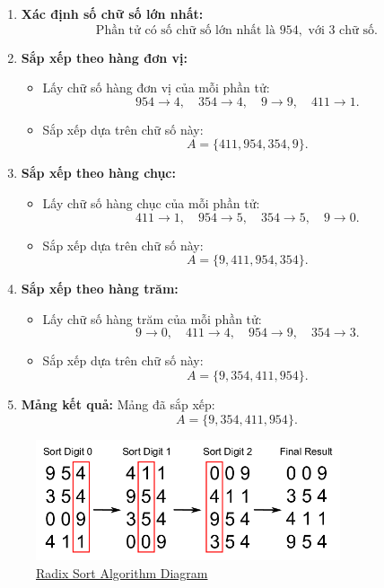 \begin{enumerate}
    \item \textbf{Xác định số chữ số lớn nhất:}
    \[
    \text{Phần tử có số chữ số lớn nhất là } 954, \text{ với 3 chữ số.}
    \]

    \item \textbf{Sắp xếp theo hàng đơn vị:}
    \begin{itemize}
        \item Lấy chữ số hàng đơn vị của mỗi phần tử:
        \[
        954 \rightarrow 4, \quad 354 \rightarrow 4, \quad 9 \rightarrow 9, \quad 411 \rightarrow 1.
        \]
        \item Sắp xếp dựa trên chữ số này:
        \[
        A = \{411, 954, 354, 9\}.
        \]
    \end{itemize}

    \item \textbf{Sắp xếp theo hàng chục:}
    \begin{itemize}
        \item Lấy chữ số hàng chục của mỗi phần tử:
        \[
        411 \rightarrow 1, \quad 954 \rightarrow 5, \quad 354 \rightarrow 5, \quad 9 \rightarrow 0.
        \]
        \item Sắp xếp dựa trên chữ số này:
        \[
        A = \{9, 411, 954, 354\}.
        \]
    \end{itemize}

    \item \textbf{Sắp xếp theo hàng trăm:}
    \begin{itemize}
        \item Lấy chữ số hàng trăm của mỗi phần tử:
        \[
        9 \rightarrow 0, \quad 411 \rightarrow 4, \quad 954 \rightarrow 9, \quad 354 \rightarrow 3.
        \]
        \item Sắp xếp dựa trên chữ số này:
        \[
        A = \{9, 354, 411, 954\}.
        \]
    \end{itemize}

    \item \textbf{Mảng kết quả:}
    Mảng đã sắp xếp:
    \[
    A = \{9, 354, 411, 954\}.
    \]

\end{enumerate}


\begin{figure}[H]
    \centering
    \includegraphics[width=0.8\textwidth]{img/radix.png}
    \caption{\href{https://velog.velcdn.com/images/shitaikoto/post/cc26c311-7ca9-4235-b134-27fc6480b3e9/radix.png}{Radix Sort Algorithm Diagram}}
\end{figure}

